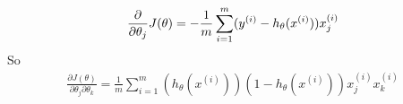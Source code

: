 \begin{answer}
    \begin{equation}
        \frac{\partial}{\partial \theta_{j}}J(\theta) = -\frac{1}{m}\sum_{i=1}^{m}(y^{(i)}-h_{\theta}(x^{(i)}))x_j^{(i)} \\
    \end{equation}
    So
    \begin{align}
        \frac{\partial J(\theta)}{\partial \theta_{j}\partial \theta_{k}} = \frac{1}{m}\sum_{i=1}^{m}(h_{\theta}(x^{(i)}))(1-h_{\theta}(x^{(i)}))x_j^{(i)}x_k^{(i)}
    \end{align}
\end{answer}